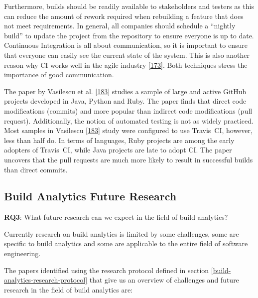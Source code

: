 \documentclass[]{book}
\begin{document}
Furthermore, builds should be readily available to stakeholders and
testers as this can reduce the amount of rework required when rebuilding
a feature that does not meet requirements. In general, all companies
should schedule a ``nightly build'' to update the project from the
repository to ensure everyone is up to date. Continuous Integration is
all about communication, so it is important to ensure that everyone can
easily see the current state of the system. This is also another reason
why CI works well in the agile industry
{[}\protect\hyperlink{ref-stolberg2009enabling}{173}{]}. Both techniques
stress the importance of good communication.

The paper by Vasilescu et al.
{[}\protect\hyperlink{ref-vasilescu2014continuous}{183}{]} studies a
sample of large and active GitHub projects developed in Java, Python and
Ruby. The paper finds that direct code modifications (commits) and more
popular than indirect code modifications (pull request). Additionally,
the notion of automated testing is not as widely practiced. Most samples
in Vasilescu {[}\protect\hyperlink{ref-vasilescu2014continuous}{183}{]}
study were configured to use Travis~CI, however, less than half do. In
terms of languages, Ruby projects are among the early adopters of
Travis~CI, while Java projects are late to adopt CI. The paper uncovers
that the pull requests are much more likely to result in successful
builds than direct commits.

\subsection{Build Analytics Future
Research}\label{build-analytics-future-research}

\textbf{RQ3}: What future research can we expect in the field of build
analytics?

Currently research on build analytics is limited by some challenges,
some are specific to build analytics and some are applicable to the
entire field of software engineering.

The papers identified using the research protocol defined in section
\ref{build-analytics-research-protocol} that give us an overview of
challenges and future research in the field of build analytics are:
\end{document}
